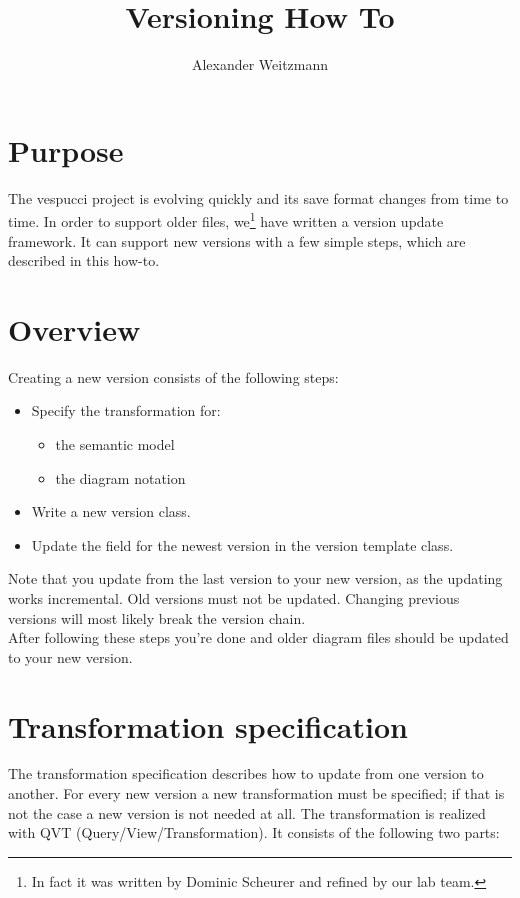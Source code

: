 \documentclass[12pt,a4paper,oneside]{report}
\author{Alexander Weitzmann}
\title{Versioning How To}
\begin{document}
\thispagestyle{empty}
\maketitle

\section*{Purpose}
The vespucci project is evolving quickly and its save format changes from time to time. In order to support older files, we\footnote{In fact it was written by Dominic Scheurer and refined by our lab team.} have written a version update framework. It can support new versions with a few simple steps, which are described in this how-to.

\section*{Overview}
Creating a new version consists of the following steps:\\
\begin{itemize}
	\item[1.] Specify the transformation for:
	\begin{itemize}
		\item the semantic model
		\item the diagram notation
	\end{itemize}
	\item[2.] Write a new version class.
	\item[3.] Update the field for the newest version in the version template class.
\end{itemize}
\medskip
Note that you update from the last version to your new version, as the updating works incremental. Old versions must not be updated. Changing previous versions will most likely break the version chain.\\
After following these steps you're done and older diagram files should be updated to your new version. 
\newpage

\section*{Transformation specification}
The transformation specification describes how to update from one version to another. For every new version a new transformation must be specified; if that is not the case a new version is not needed at all. The transformation is realized with QVT (Query/View/Transformation). It consists of the following two parts:\\
\end{document}
